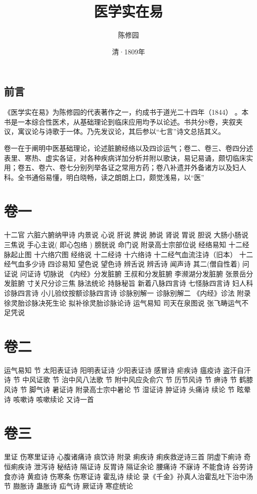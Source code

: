 \documentclass[a4paper,12pt,UTF8,twoside]{ctexbook}
\title{\heiti\zihao{0} 医学实在易}
\author{陈修园}
\date{清·1809年}
\begin{document}
\maketitle
\tableofcontents

\frontmatter
\chapter{前言}

《医学实在易》为陈修园的代表著作之一，约成书于道光二十四年（1844）
。本书是一本综合性医术，从基础理论到临床应用均予以论述。书共分8卷，夹叙夹议，寓议论与诗歌于一体。乃先发议论，其后参以“七言”诗文总括其义。

卷一在于阐明中医基础理论，论述脏腑经络以及四诊运气；卷二、卷三、卷四分述表里、寒热、虚实各证，对各种疾病详加分析并附以歌诀，易记易诵，颇切临床实用；卷五、卷六、卷七分别列举各证之常用方药；卷八补遗并外备诸方以及妇人科。全书通俗易懂，明白晓畅，读之朗朗上口，颇觉浅易，以“医”

\mainmatter
\part{卷一}

十二官
六脏六腑纳甲诗
内景说
心说
肝说
脾说
肺说
肾说
胃说
胆说
大肠小肠说
三焦说
手心主说( 即心包络 )
膀胱说
命门说
附录高士宗部位说
经络易知
十二经脉起止图
十六络穴图
经络说
十二经诗
十六络诗
十二经气血流注诗（旧本）
十二经气血多少诗
四诊易知
望色说
望色诗
辨舌说
辨舌诗
闻声诗
其二(僧自性着) 
问证说
问证诗
切脉说
《内经》分发脏腑
王叔和分发脏腑
李濒湖分发脏腑
张景岳分发脏腑
寸关尺分诊三焦
脉法统论
持脉秘旨
新着八脉四言诗
七怪脉四言诗
妇人科诊脉四言诗
小儿验纹按额诊脉四言诗
诊脉别解一
诊脉别解二
《内经》诊法
附录徐灵胎诊脉决死生论
拟补徐灵胎诊脉论诗
运气易知
司天在泉图说
张飞畴运气不足凭说

\part{卷二}
运气易知 节
太阳表证诗
阳明表证诗
少阳表证诗
感冒诗
疟疾诗
瘟疫诗
盗汗自汗诗 节
中风证歌 节
治中风八法歌 节
附中风应灸俞穴 节
历节风诗 节
痹诗 节
鹤膝风诗 节
脚气诗
暑证诗
附录高士宗中暑论 节
湿证诗
肿证诗
头痛诗
续论 节
眩晕诗
咳嗽诗
咳嗽续论
又诗一首
\part{卷三}
里证
伤寒里证诗
心腹诸痛诗
痰饮诗
附录
痢疾诗
痢疾救逆诗三首
阴虚下痢诗
奇恒痢疾诗
泄泻诗
秘结诗
隔证诗
反胃诗
隔证余论
腰痛诗
不寐诗
不能食诗
谷劳诗
食亦诗
黄疸诗
伤寒条
伤寒证诗
霍乱诗
续论
录《千金》孙真人治霍乱吐下治中汤 节
臌胀诗
蛊胀诗
疝气诗
厥证诗
寒症统论
\end{document}
